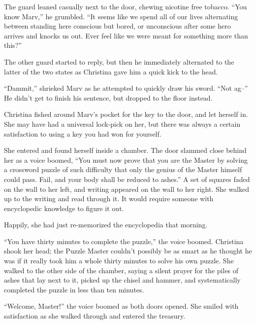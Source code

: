 \documentclass[showtrims,b6paper,draft,10pt]{memoir}
\begin{document}
\newcommand{\timeskip}{\begin{center}* * *\end{center}}

The guard leaned casually next to the door, chewing nicotine free tobacco.  “You know Marv,” he grumbled.  “It seems like we spend all of our lives alternating between standing here conscious but bored, or unconscious after some hero arrives and knocks us out.  Ever feel like we were meant for something more than this?”

The other guard started to reply, but then he immediately alternated to the latter of the two states as Christina gave him a quick kick to the head.

``Dammit,'' shrieked Marv as he attempted to quickly draw his sword.  ``Not ag--''  He didn’t get to finish his sentence, but dropped to the floor instead.

Christina fished around Marv’s pocket for the key to the door, and let herself in.  She may have had a universal lock-pick on her, but there was always a certain satisfaction to using a key you had won for yourself.

She entered and found herself inside a chamber.  The door slammed close behind her as a voice boomed, ``You must now prove that you are the Master by solving a crossword puzzle of such difficulty that only the genius of the Master himself could pass.  Fail, and your body shall be reduced to ashes.''  A set of squares faded on the wall to her left, and writing appeared on the wall to her right.  She walked up to the writing and read through it.  It would require someone with encyclopedic knowledge to figure it out.

Happily, she had just re-memorized the encyclopedia that morning.

``You have thirty minutes to complete the puzzle,'' the voice boomed.  Christina shook her head;  the Puzzle Master couldn’t possibly be as smart as he thought he was if it really took him a whole thirty minutes to solve his own puzzle.  She walked to the other side of the chamber, saying a silent prayer for the piles of ashes that lay next to it, picked up the chisel and hammer, and systematically completed the puzzle in less than ten minutes.

``Welcome, Master!''  the voice boomed as both doors opened.  She smiled with satisfaction as she walked through and entered the treasury.
\end{document}
